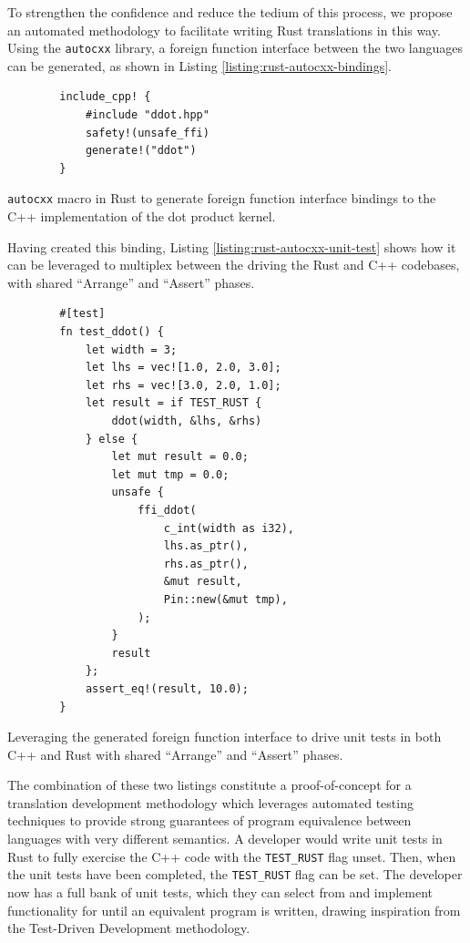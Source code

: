 To strengthen the confidence and reduce the tedium of this process, we propose an automated methodology to facilitate writing Rust translations in this way. Using the \texttt{autocxx} library, a foreign function interface between the two languages can be generated,
as shown in Listing \ref{listing:rust-autocxx-bindings}.

\begin{listing}[H]
    \begin{verbatim}
        include_cpp! {
            #include "ddot.hpp"
            safety!(unsafe_ffi)
            generate!("ddot")
        }
    \end{verbatim}
    \vspace{-0.5cm}
    \caption{\texttt{autocxx} macro in Rust to generate foreign function interface bindings to the C++ implementation of the dot product kernel.}
    \label{listing:rust-autocxx-bindings}
\end{listing}

Having created this binding, Listing \ref{listing:rust-autocxx-unit-test} shows how it can be leveraged to multiplex between the driving the Rust and C++ codebases, with shared ``Arrange'' and ``Assert'' phases.

\begin{code}
    \begin{verbatim}
        #[test]
        fn test_ddot() {
            let width = 3;
            let lhs = vec![1.0, 2.0, 3.0];
            let rhs = vec![3.0, 2.0, 1.0];
            let result = if TEST_RUST {
                ddot(width, &lhs, &rhs)
            } else {
                let mut result = 0.0;
                let mut tmp = 0.0;
                unsafe {
                    ffi_ddot(
                        c_int(width as i32),
                        lhs.as_ptr(),
                        rhs.as_ptr(),
                        &mut result,
                        Pin::new(&mut tmp),
                    );
                }
                result
            };
            assert_eq!(result, 10.0);
        }
    \end{verbatim}
    \caption{Leveraging the generated foreign function interface to drive unit tests in both C++ and Rust with shared ``Arrange'' and ``Assert'' phases.}
    \label{listing:rust-autocxx-unit-test}
\end{code}

The combination of these two listings constitute a proof-of-concept for a translation development methodology which leverages automated testing techniques to provide strong guarantees of program equivalence between languages with very different semantics. A developer would write unit tests in Rust to fully exercise the C++ code with the \texttt{TEST_RUST} flag unset. Then, when the unit tests have been completed, the \texttt{TEST_RUST} flag can be set. The developer now has a full bank of unit tests, which they can select from and implement functionality for until an equivalent program is written, drawing inspiration from the Test-Driven Development methodology.


